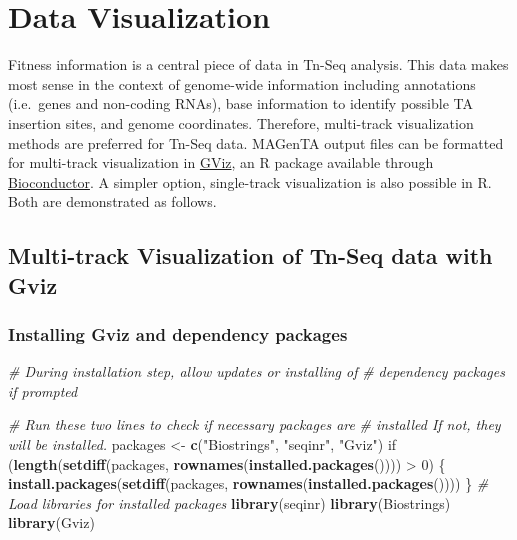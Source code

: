 \documentclass[11pt,]{article}
\newenvironment{Shaded}{\begin{snugshade}}{\end{snugshade}}
\newcommand{\KeywordTok}[1]{\textcolor[rgb]{0.13,0.29,0.53}{\textbf{{#1}}}}
\newcommand{\DecValTok}[1]{\textcolor[rgb]{0.00,0.00,0.81}{{#1}}}
\newcommand{\StringTok}[1]{\textcolor[rgb]{0.31,0.60,0.02}{{#1}}}
\newcommand{\CommentTok}[1]{\textcolor[rgb]{0.56,0.35,0.01}{\textit{{#1}}}}
\newcommand{\NormalTok}[1]{{#1}}
\begin{document}
\newpage

\section{Data Visualization}\label{data-visualization}

Fitness information is a central piece of data in Tn-Seq analysis. This
data makes most sense in the context of genome-wide information
including annotations (i.e.~genes and non-coding RNAs), base information
to identify possible TA insertion sites, and genome coordinates.
Therefore, multi-track visualization methods are preferred for Tn-Seq
data. MAGenTA output files can be formatted for multi-track
visualization in
\href{http://bioconductor.org/packages/devel/bioc/vignettes/Gviz/inst/doc/Gviz.pdf}{GViz},
an R package available through
\href{https://bioconductor.org/packages/release/bioc/html/Gviz.html}{Bioconductor}.
A simpler option, single-track visualization is also possible in R. Both
are demonstrated as follows.

\subsection{Multi-track Visualization of Tn-Seq data with
Gviz}\label{multi-track-visualization-of-tn-seq-data-with-gviz}

\subsubsection{Installing Gviz and dependency
packages}\label{installing-gviz-and-dependency-packages}

\begin{Shaded}
\begin{Highlighting}[]
\CommentTok{# During installation step, allow updates or installing of}
\CommentTok{# dependency packages if prompted}

\CommentTok{# Run these two lines to check if necessary packages are}
\CommentTok{# installed If not, they will be installed.}
\NormalTok{packages <-}\StringTok{ }\KeywordTok{c}\NormalTok{(}\StringTok{"Biostrings"}\NormalTok{, }\StringTok{"seqinr"}\NormalTok{, }\StringTok{"Gviz"}\NormalTok{)}
\NormalTok{if (}\KeywordTok{length}\NormalTok{(}\KeywordTok{setdiff}\NormalTok{(packages, }\KeywordTok{rownames}\NormalTok{(}\KeywordTok{installed.packages}\NormalTok{()))) >}\StringTok{ }
\StringTok{    }\DecValTok{0}\NormalTok{) \{}
    \KeywordTok{install.packages}\NormalTok{(}\KeywordTok{setdiff}\NormalTok{(packages, }\KeywordTok{rownames}\NormalTok{(}\KeywordTok{installed.packages}\NormalTok{())))}
\NormalTok{\}}
\CommentTok{# Load libraries for installed packages}
\KeywordTok{library}\NormalTok{(seqinr)}
\KeywordTok{library}\NormalTok{(Biostrings)}
\KeywordTok{library}\NormalTok{(Gviz)}
\end{Highlighting}
\end{Shaded}
\end{document}
